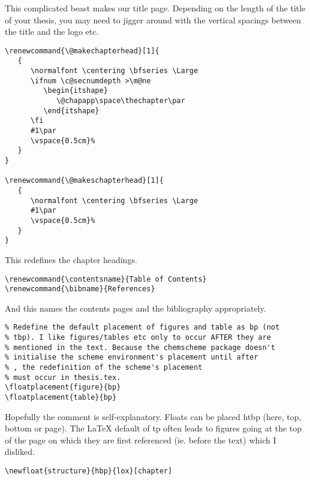 \normalsize\doublespacing
This complicated beast makes our title page.  Depending on the length of the title of your thesis, you may need to jigger around with the vertical spacings between the title and the logo etc.

\small\singlespacing
\begin{verbatim}
\renewcommand{\@makechapterhead}[1]{
   {
      \normalfont \centering \bfseries \Large
      \ifnum \c@secnumdepth >\m@ne
         \begin{itshape}
            \@chapapp\space\thechapter\par
         \end{itshape}
      \fi
      #1\par
      \vspace{0.5cm}%
   }
}

\renewcommand{\@makeschapterhead}[1]{
   {
      \normalfont \centering \bfseries \Large
      #1\par
      \vspace{0.5cm}%
   }
}
\end{verbatim}

\normalsize\doublespacing
This redefines the chapter headings.

\small\singlespacing
\begin{verbatim}
\renewcommand{\contentsname}{Table of Contents}
\renewcommand{\bibname}{References}
\end{verbatim}

\normalsize\doublespacing
And this names the contents pages and the bibliography appropriately.

\small\singlespacing
\begin{verbatim}
% Redefine the default placement of figures and table as bp (not
% tbp). I like figures/tables etc only to occur AFTER they are
% mentioned in the text. Because the chemscheme package doesn't
% initialise the scheme environment's placement until after
% , the redefinition of the scheme's placement
% must occur in thesis.tex.
\floatplacement{figure}{bp}
\floatplacement{table}{bp}
\end{verbatim}

\normalsize\doublespacing
Hopefully the comment is self-explanatory.  Floats can be placed htbp (here, top, bottom or page).  The \LaTeX{} default of tp often leads to figures going at the top of the page on which they are first referenced (ie. before the text) which I disliked.

\small\singlespacing
\begin{verbatim}
\newfloat{structure}{hbp}{lox}[chapter]
\end{verbatim}

